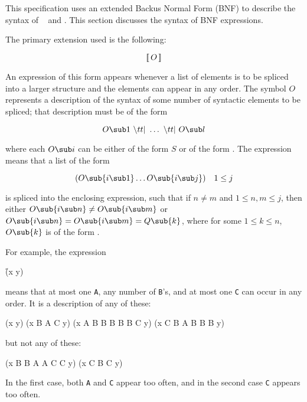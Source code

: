 \endlist

\endsubsubsection%

This specification uses an extended Backus Normal Form (BNF) to
describe the syntax of \clisp\  and .
This section discusses the syntax of BNF expressions.


The primary extension used is the following:

$$\hbox{\interleave{$O$}}$$

An expression of this form appears whenever a list of elements is
to be spliced into a larger structure and the elements can appear in
any order. The symbol $O$ represents a description of the syntax of
some number of syntactic elements to be spliced; that description must
be of the form

$$O\sub 1\ \vert\ \ldots\ \vert\ O\sub l$$

\noindent where each $O\sub i$ can be either of the form $S$ or of
the form .  The expression  means that a
list of the form

$$(O\sub{i\sub 1}\ldots O\sub{i\sub j})\quad 1\leq j$$

\noindent is spliced into the enclosing expression,
such that if $n \neq m$ and $1\leq n,m\leq j$,
then either $O\sub{i\sub n}\neq O\sub{i\sub m}$
         or $O\sub{i\sub n} = O\sub{i\sub m} = Q\sub{k}$, 
where for some $1\leq k \leq n$, $O\sub{k}$ is of the form .

For example, the expression

\f{(x  y)}

\noindent means that at most one {\tt A}, any number of {\tt B}'s, and
at most one {\tt C} can occur in any order.
It is a description of any of these:

\code
 (x y)
 (x B A C y)
 (x A B B B B B C y)
 (x C B A B B B y)
\endcode

\noindent but not any of these:

\code
 (x B B A A C C y)
 (x C B C y)
\endcode

\noindent In the first case, both {\tt A} and {\tt C} appear too often,
and in the second case {\tt C} appears too often.

\endsubsubsubsection%

